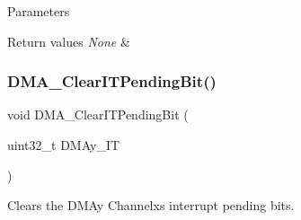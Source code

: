 \begin{DoxyParams}{Parameters}
\\
\hline
\end{DoxyParams}

\begin{DoxyRetVals}{Return values}
{\em None} & \\
\hline
\end{DoxyRetVals}
\mbox{\label{group___d_m_a___exported___functions_ga91a7340e5b334a942f3eb1e05ed5f67a}} 
\subsubsection{\texorpdfstring{DMA\_ClearITPendingBit()}{DMA\_ClearITPendingBit()}}
{\footnotesize\ttfamily void D\+M\+A\+\_\+\+Clear\+I\+T\+Pending\+Bit (\begin{DoxyParamCaption}\item[{uint32\+\_\+t}]{D\+M\+Ay\+\_\+\+IT }\end{DoxyParamCaption})}



Clears the D\+M\+Ay Channelx\textquotesingle{}s interrupt pending bits. 


